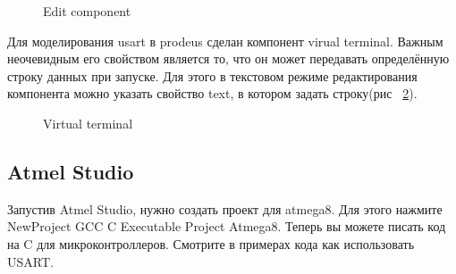 \documentclass[12pt]{article}
\begin{document}
\begin{figure}[h!] 
\caption{Edit component}
\label{p3}
\end{figure}
Для моделирования usart в prodeus сделан компонент virual terminal. Важным неочевидным его свойством является то, что он может передавать определённую строку данных при запуске. Для этого 
в текстовом режиме редактирования компонента можно указать свойство text, в котором задать строку(рис ~\ref{vt}).
\begin{figure}[h!] 
\caption{Virtual terminal}
\label{vt}
\end{figure}
\newpage
\subsection{Atmel Studio}

Запустив Atmel Studio, нужно создать проект для atmega8. Для этого нажмите NewProject GCC C Executable Project Atmega8. Теперь вы можете писать код на C для микроконтроллеров. Смотрите в примерах кода как использовать USART. 
\end{document}
